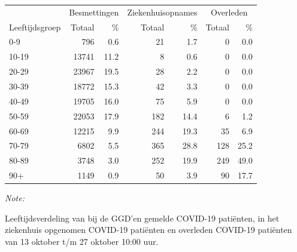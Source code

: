 \documentclass[
  english,
  man,floatsintext]{apa6}
\begin{document}
\begin{table}[H]
\centering\begingroup\fontsize{11}{13}\selectfont

\begin{threeparttable}
\begin{tabular}{lrrrrrr}
\toprule
\multicolumn{1}{c}{ } & \multicolumn{2}{c}{Besmettingen} & \multicolumn{2}{c}{Ziekenhuisopnames} & \multicolumn{2}{c}{Overleden} \\
\cmidrule(l{3pt}r{3pt}){2-3} \cmidrule(l{3pt}r{3pt}){4-5} \cmidrule(l{3pt}r{3pt}){6-7}
Leeftijdsgroep & Totaal & \% & Totaal & \% & Totaal & \%\\
\midrule
0-9 & 796 & 0.6 & 21 & 1.7 & 0 & 0.0\\
10-19 & 13741 & 11.2 & 8 & 0.6 & 0 & 0.0\\
20-29 & 23967 & 19.5 & 28 & 2.2 & 0 & 0.0\\
30-39 & 18772 & 15.3 & 42 & 3.3 & 0 & 0.0\\
40-49 & 19705 & 16.0 & 75 & 5.9 & 0 & 0.0\\
50-59 & 22053 & 17.9 & 182 & 14.4 & 6 & 1.2\\
60-69 & 12215 & 9.9 & 244 & 19.3 & 35 & 6.9\\
70-79 & 6802 & 5.5 & 365 & 28.8 & 128 & 25.2\\
80-89 & 3748 & 3.0 & 252 & 19.9 & 249 & 49.0\\
90+ & 1149 & 0.9 & 50 & 3.9 & 90 & 17.7\\
\bottomrule
\end{tabular}
\begin{tablenotes}
\item \textit{Note: } 
\item Leeftijdsverdeling van bij de GGD’en gemelde COVID-19 patiënten, in het ziekenhuis opgenomen COVID-19 patiënten en overleden COVID-19 patiënten van 13 oktober t/m 27 oktober 10:00 uur.
\end{tablenotes}
\end{threeparttable}
\endgroup{}
\end{table}
\end{document}
